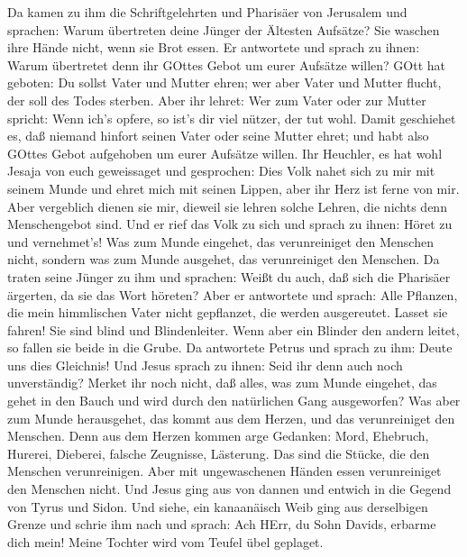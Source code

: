  Da kamen zu ihm die Schriftgelehrten und Pharisäer von
Jerusalem und sprachen:  Warum übertreten deine Jünger der
Ältesten Aufsätze? Sie waschen ihre Hände nicht, wenn sie Brot essen.
 Er antwortete und sprach zu ihnen: Warum übertretet denn
ihr GOttes Gebot um eurer Aufsätze willen?  GOtt hat
geboten: Du sollst Vater und Mutter ehren; wer aber Vater und Mutter
flucht, der soll des Todes sterben.  Aber ihr lehret: Wer
zum Vater oder zur Mutter spricht: Wenn ich's opfere, so ist's dir viel
nützer, der tut wohl.  Damit geschiehet es, daß niemand
hinfort seinen Vater oder seine Mutter ehret; und habt also GOttes Gebot
aufgehoben um eurer Aufsätze willen.  Ihr Heuchler, es hat
wohl Jesaja von euch geweissaget und gesprochen:  Dies Volk
nahet sich zu mir mit seinem Munde und ehret mich mit seinen Lippen,
aber ihr Herz ist ferne von mir.  Aber vergeblich dienen sie
mir, dieweil sie lehren solche Lehren, die nichts denn Menschengebot
sind.  Und er rief das Volk zu sich und sprach zu ihnen:
Höret zu und vernehmet's!  Was zum Munde eingehet, das
verunreiniget den Menschen nicht, sondern was zum Munde ausgehet, das
verunreiniget den Menschen.  Da traten seine Jünger zu ihm
und sprachen: Weißt du auch, daß sich die Pharisäer ärgerten, da sie das
Wort höreten?  Aber er antwortete und sprach: Alle
Pflanzen, die mein himmlischen Vater nicht gepflanzet, die werden
ausgereutet.  Lasset sie fahren! Sie sind blind und
Blindenleiter. Wenn aber ein Blinder den andern leitet, so fallen sie
beide in die Grube.  Da antwortete Petrus und sprach zu
ihm: Deute uns dies Gleichnis!  Und Jesus sprach zu ihnen:
Seid ihr denn auch noch unverständig?  Merket ihr noch
nicht, daß alles, was zum Munde eingehet, das gehet in den Bauch und
wird durch den natürlichen Gang ausgeworfen?  Was aber zum
Munde herausgehet, das kommt aus dem Herzen, und das verunreiniget den
Menschen.  Denn aus dem Herzen kommen arge Gedanken: Mord,
Ehebruch, Hurerei, Dieberei, falsche Zeugnisse, Lästerung. 
Das sind die Stücke, die den Menschen verunreinigen. Aber mit
ungewaschenen Händen essen verunreiniget den Menschen nicht.
 Und Jesus ging aus von dannen und entwich in die Gegend
von Tyrus und Sidon.  Und siehe, ein kanaanäisch Weib ging
aus derselbigen Grenze und schrie ihm nach und sprach: Ach HErr, du Sohn
Davids, erbarme dich mein! Meine Tochter wird vom Teufel übel geplaget.
